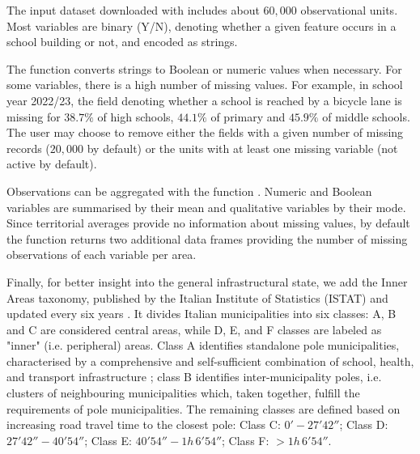 \documentclass[openany, 11pt, oneside]{book}
\begin{document}
The input dataset downloaded with \texttt{} includes about $60,000$ observational units. Most variables are binary (Y/N), denoting whether a given feature occurs in a school building or not, and encoded as strings.

The function \texttt{} converts strings to Boolean or numeric values when necessary. For some variables, there is a high number of missing values. For example, in school year 2022/23, the field denoting whether a school is reached by a bicycle lane is missing for $38.7\%$ of high schools, $44.1 \%$ of primary and $45.9\%$ of middle schools. The user may choose to remove either the fields with a given number of missing records ($20,000$ by default) or the units with at least one missing variable (not active by default). 

Observations can be aggregated with the function \texttt{}. Numeric and Boolean variables are summarised by their mean and qualitative variables by their mode. Since territorial averages provide no information about missing values, by default the function returns two additional data frames providing the number of missing observations of each variable per area.

Finally, for better insight into the general infrastructural state, we add the Inner Areas taxonomy, published by the Italian Institute of Statistics (ISTAT) and updated every six years \parencite{InnerAreas}. It divides Italian municipalities into six classes: A, B and C are considered central areas, while D, E, and F classes are labeled as "inner" (i.e. peripheral) areas. Class A identifies standalone pole municipalities, characterised by a comprehensive and self-sufficient combination of school, health, and transport infrastructure \parencite{InnerAreas}; class B identifies inter-municipality poles, i.e. clusters of neighbouring municipalities which, taken together, fulfill the requirements of pole municipalities. The remaining classes are defined based on increasing road travel time to the closest pole: Class C: $0' - 27'42''$; Class D: $27'42'' - 40'54''$; Class E: $40'54'' - 1h \, 6' 54''$; Class F: $> 1h \, 6' 54''$.
\end{document}

